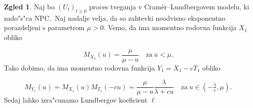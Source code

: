\documentclass[12pt, a4paper, reqno]{amsart}
\theoremstyle{definition}
\newtheorem{zgled}[definicija]{Zgled}
\theoremstyle{plain}
\newcommand{\1}{\mathds{1}}
\begin{document}
            \begin{zgled}
                Naj bo $(U_t)_{t\geq0}$ proces tveganja v Cramér--Lundbergovem modelu, ki zado"s"ca NPC.\ Naj 
                nadalje velja, da so zahtevki neodvisno eksponentno porazdeljeni s parametrom $\mu > 0$. 
                Vemo, da ima momentno rodovna funkcija $X_1$ obliko 

                \begin{equation*}
                    M_{X_1}(u) = \frac{\mu}{\mu - u} \quad \text{za} \ u<\mu.
                \end{equation*}
                Tako dobimo, da ima momentno rodovna funkcija $Y_1 = X_1 - cT_1$ obliko 

                \begin{equation*}
                    M_{Y_1}(u) = M_{X_1}(u)M_{T_1}(-cu) = 
                    \frac{\mu}{\mu - u}\frac{\lambda}{\lambda + cu} \quad \text{za} \ u\in (-\tfrac{\lambda}{c}, \mu).
                \end{equation*}
                Sedaj lahko izra"cunamo Lundbergov koeficient $\ell$


\end{zgled}
\end{document}

